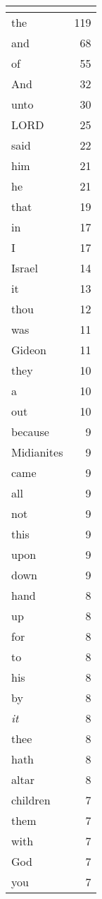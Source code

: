 \begin{center}
\begin{longtable}{l|r}
\hline \multicolumn{2}{c}{{ }} \\ \hline
\endfoot 
the & 119\\ \hline 
and & 68\\ \hline 
of & 55\\ \hline 
And & 32\\ \hline 
unto & 30\\ \hline 
LORD & 25\\ \hline 
said & 22\\ \hline 
him & 21\\ \hline 
he & 21\\ \hline 
that & 19\\ \hline 
in & 17\\ \hline 
I & 17\\ \hline 
Israel & 14\\ \hline 
it & 13\\ \hline 
thou & 12\\ \hline 
was & 11\\ \hline 
Gideon & 11\\ \hline 
they & 10\\ \hline 
a & 10\\ \hline 
out & 10\\ \hline 
because & 9\\ \hline 
Midianites & 9\\ \hline 
came & 9\\ \hline 
all & 9\\ \hline 
not & 9\\ \hline 
this & 9\\ \hline 
upon & 9\\ \hline 
down & 9\\ \hline 
hand & 8\\ \hline 
up & 8\\ \hline 
for & 8\\ \hline 
to & 8\\ \hline 
his & 8\\ \hline 
by & 8\\ \hline 
\emph{it} & 8\\ \hline 
thee & 8\\ \hline 
hath & 8\\ \hline 
altar & 8\\ \hline 
children & 7\\ \hline 
them & 7\\ \hline 
with & 7\\ \hline 
God & 7\\ \hline 
you & 7\\ \hline 

\end{longtable}
\end{center}
